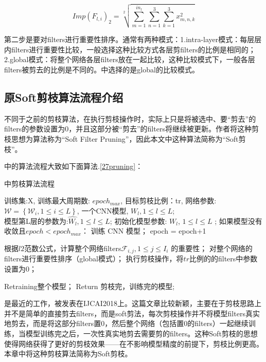 \documentclass[ pdftex, oneside, master]{NJUthesis}
\begin{document}
\begin{equation*}
Imp(F_{l,i})_2 =  \sqrt[2]{\sum_{m=1}^{in_l}\sum_{n=1}^3\sum_{k=1}^3 x_{m,n,k}^2}
\label{l2}
\end{equation*}

第二步是要对filters进行重要性排序。通常有两种模式：1.intra-layer模式：每层层内filters进行重要性比较，一般选择这种比较方式各层剪filters的比例是相同的；2.global模式：将整个网络各层filters放在一起比较，这种比较模式下，一般各层filters被剪去的比例是不同的。\cite{17}中选择的是global的比较模式。


\subsection{原Soft剪枝算法流程介绍}

不同于之前的剪枝算法，\cite{27}在执行剪枝操作时，实际上只是将被选中、要“剪去”的filters的参数设置为0，并且这部分被“剪去”的filters将继续被更新。作者将这种剪枝思想为算法称为“Soft Filter Pruning”，因此本文中这种算法简称为“Soft剪枝”。

\cite{27}中的算法流程大致如下面算法.\ref{27pruning}：

\begin{algorithm}[htb]
  \caption{\cite{27}中剪枝算法流程}
  \label{27pruning}
  \begin{algorithmic}[1]
    \REQUIRE
      训练集:X, 训练最大周期数: $epoch_{max}$,
      目标剪枝比例：tr,
      网络参数: $\mathcal{W} = \left\{\mathcal{W}_i , 1\leq i \leq L \right\}$,
      一个CNN模型, ${W_l,1\leq l\leq L}$;\\
    \ENSURE 模型第L层的参数为:${\hat{W_l}, 1\leq l\leq L}$;
    \STATE 初始化模型参数: ${W_l}$, ${1\leq l\leq L}$ ;
    \STATE 如果模型没有收敛且$epoch<epoch_{max}$：
    \STATE \qquad 训练 CNN 模型；
    \STATE \qquad epoch = epoch+1

    \STATE \qquad 根据$l2$范数公式，计算整个网络filters$\mathcal{F}_{i,j}, 1\leq j \leq I_i$ 的重要性；
    \STATE \qquad 对整个网络的filters进行重要性排序（global模式）；
    \STATE \qquad 执行剪枝操作，将$tr$比例的的filters中参数设置为0；

    \STATE \qquad Retraining整个模型；
    \STATE Return 剪枝完，训练完的模型;
  \end{algorithmic}
\end{algorithm}

\cite{27}是最近的工作，被发表在IJCAI2018上。这篇文章比较新颖，主要在于剪枝思路上并不是简单的直接剪去filters，而是soft剪法，每次剪枝操作并不将模型filters真实地剪去，而是将这部分filters置0，然后整个网络（包括置0的filters）一起继续训练，当模型训练完之后，一次性真实地剪去需要剪的filters。这种Soft剪枝的思想使得网络获得了更好的剪枝效果——在不影响模型精度的前提下，剪枝比例更高。本章中将这种剪枝算法简称为Soft剪枝。
\end{document}
